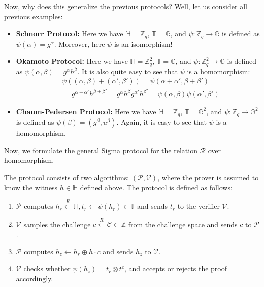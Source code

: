 \documentclass[../lecture-notes-105x135.tex]{subfiles}
\begin{document}
\begin{proposition}
    Now, why does this generalize the previous protocols? Well, let us consider all previous examples:
    \begin{itemize}
        \item \textbf{Schnorr Protocol:} Here we have $\mathbb{H} = \mathbb{Z}_q$, $\mathbb{T} = \mathbb{G}$, and $\psi: \mathbb{Z}_q \to \mathbb{G}$ is defined as $\psi(\alpha) = g^{\alpha}$. Moreover, here $\psi$ is an isomorphism!
        \item \textbf{Okamoto Protocol:} Here we have $\mathbb{H} = \mathbb{Z}_q^2$, $\mathbb{T} = \mathbb{G}$, and $\psi: \mathbb{Z}_q^2 \to \mathbb{G}$ is defined as $\psi(\alpha,\beta) = g^{\alpha}h^{\beta}$. It is also quite easy to see that $\psi$ is a homomorphism:
        \begin{equation*}
            \begin{aligned}
                &\psi((\alpha,\beta) + (\alpha',\beta')) = \psi(\alpha+\alpha',\beta+\beta') = \\ 
                &= g^{\alpha+\alpha'}h^{\beta+\beta'} = g^{\alpha}h^{\beta}g^{\alpha'}h^{\beta'} = \psi(\alpha,\beta)\psi(\alpha',\beta')                
            \end{aligned}
        \end{equation*}
        \item \textbf{Chaum-Pedersen Protocol:} Here we have $\mathbb{H} = \mathbb{Z}_q$, $\mathbb{T} = \mathbb{G}^2$, and $\psi: \mathbb{Z}_q \to \mathbb{G}^2$ is defined as $\psi(\beta) = (g^{\beta},u^{\beta})$. Again, it is easy to see that $\psi$ is a homomorphism.
    \end{itemize}
\end{proposition}

\vspace{-1mm}

Now, we formulate the general Sigma protocol for the relation $\mathcal{R}$ over homomorphism.

\vspace{-1mm}

\begin{definition}
    The protocol consists of two algorithms: $(\mathcal{P}, \mathcal{V})$, where the prover is assumed to know the witness $h \in \mathbb{H}$ defined above. The protocol is defined as follows:
    \begin{enumerate}
        \item $\mathcal{P}$ computes $h_r \xleftarrow{R} \mathbb{H}, t_r \gets \psi(h_r) \in \mathbb{T}$ and sends $t_r$ to the verifier $\mathcal{V}$.
        \item $\mathcal{V}$ samples the challenge $c \xleftarrow{R} \mathcal{C} \subset \mathbb{Z}$ from the challenge space and sends $c$ to $\mathcal{P}$.
        \item $\mathcal{P}$ computes $h_z \gets h_r \oplus h\cdot c$ and sends $h_z$ to $\mathcal{V}$.
        \item $\mathcal{V}$ checks whether $\psi(h_z) = t_r \otimes t^c$, and accepts or rejects the proof accordingly.
    \end{enumerate}
\end{definition}
\end{document}
